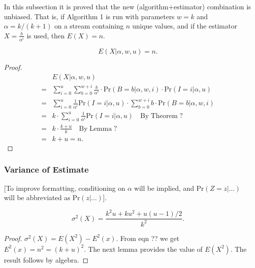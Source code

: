 \documentclass{sig-alternate}
\begin{document}
In this subsection it is proved that the new
(algorithm+estimator) combination is unbiased. That is, if Algorithm 1
is run with parameters $w=k$ and $\alpha = k/(k+1)$ on a stream
containing $n$ unique values, and if the estimator
$X=\frac{b}{\alpha^i}$ is used, then $E(X)=n$.

\begin{equation}
E(X | \alpha, w, u) = n.
\end{equation}
\begin{proof}
\begin{align}
 & E(X | \alpha, w, u)  \\
= & \sum_{i=0}^u \sum_{b=0}^{w+i}
\frac{b}{\alpha^i} \cdot \mathrm{Pr}(B \!=\! b | \alpha, w, i) \cdot
\mathrm{Pr}(I \!=\! i | \alpha, u) \\
= &\sum_{i=0}^u \frac{1}{\alpha^i} \mathrm{Pr}(I \!=\! i | \alpha, u) \cdot 
\sum_{b=0}^{w+i} b \cdot \mathrm{Pr}(B \!=\! b | \alpha, w, i) \\
= & k \cdot \sum_{i=0}^u \frac{1}{\alpha^i} \mathrm{Pr}(I \!=\! i | \alpha, u) \quad \mathrm{By\;Theorem\;?} \\
= & k \cdot \frac{k+u}{k} \quad \mathrm{By\;Lemma\;?} \\
= & k + u = n.
\end{align}
\end{proof}

\subsubsection{Variance of Estimate}


[To improve formatting, conditioning on $\alpha$ will be implied, and $\mathrm{Pr}(Z=z|\ldots)$ 
will be abbreviated as $\mathrm{Pr}(z|\ldots)$].

\begin{equation}
\sigma^2 (X) = \frac{k^2u + ku^2 + u(u\!-\!1)/2}{k^2}.
\end{equation}
\begin{proof} $\sigma^2 (X) = E(X^2) - E^2(x)$. From eqn ?? we get $E^2(x) = n^2 = (k+u)^2$. The next lemma
provides the value of $E(X^2)$. The result follows by algebra.
\end{proof}
\end{document}
